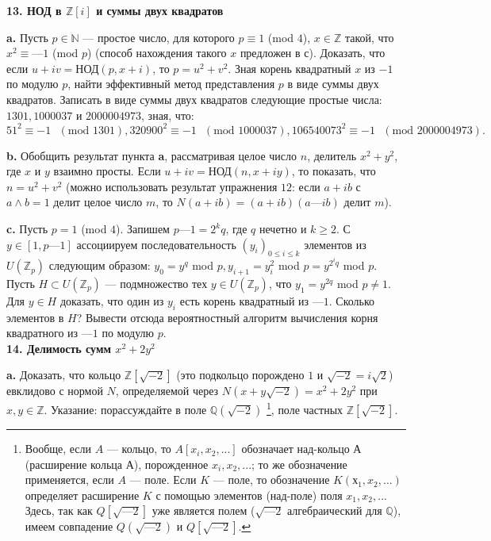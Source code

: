 \pagebreak

\noindent \textbf{13. НОД в $\mathbb{Z}[i]$ и суммы двух квадратов}

\textbf{a.} Пусть $p \in \mathbb{N}$ — простое число, для которого $p \equiv 1$ (mod $4$), $x \in \mathbb{Z}$ такой, что $x^2 \equiv —1$ (mod $p$) (способ нахождения такого $x$ предложен в с). Доказать, что если $u + iv = $НОД$(p, x + i)$, то $p = u^2 + v^2$. Зная корень квадратный $x$ из $-1$ по модулю $p$, найти эффективный метод представления $p$ в виде суммы двух квадратов. Записать в виде суммы двух квадратов следующие простые числа: $1301, 1000037$ и $2 000 004 973$, зная, что:
\[
51^2 \equiv -1 \text{ } (\text{mod } 1301), 320900^2 \equiv -1 \text{ } (\text{mod } 1000037), 106540073^2 \equiv -1 \text{ } (\text{mod } 2000004973).
\]

\textbf{b.} Обобщить результат пункта \textbf{a}, рассматривая целое число $n$, делитель $x^2 + y^2$, где $x$ и $y$ взаимно просты. Если $u+iv = $НОД$(n, x + iy)$, то показать, что $n=u^2+v^2$ (можно использовать результат 
упражнения $12$: если $a + ib$ с $a \wedge b = 1$ делит целое число $m$, то $N(a + ib) = (a + ib)(a — ib)$ делит $m$).

\textbf{c.} Пусть $p = 1$ (mod $4$). Запишем $p—1 = 2^kq$, где $q$ нечетно и $k \ge 2$. С $y \in [1,p—1]$ ассоциируем последовательность $(y_i)_{0\le i\le k}$ элементов из $U(\mathbb{Z}_p)$ следующим образом: $y_0 = y^q$ mod $p, y_{i+1} = y^2_i$ mod $p = y^{2^iq}$ mod $p$. Пусть $H \subset U(\mathbb{Z}_p)$ — подмножество тех $y \in U(\mathbb{Z}_p)$, что $y_1 = y^{2q}$ mod $p \ne
1$. Для $y \in H$ доказать, что один из $y_i$ есть корень квадратный из $—1$.
Сколько элементов в $H$? Вывести отсюда вероятностный алгоритм 
вычисления корня квадратного из $—1$ по модулю $p$.
\\

\noindent \textbf{14. Делимость сумм $x^2+2 y^2$}

\textbf{a.} Доказать, что кольцо $\mathbb{Z}[\sqrt{-2}]$ (это подкольцо порождено $1$ и $\sqrt{-2}=i\sqrt{2}$) евклидово с нормой $N$, определяемой через $N(x+y\sqrt{-2}) = x^2+2y^2$ при $x,y \in \mathbb{Z}$. Указание: порассуждайте в поле $\mathbb{Q}(\sqrt{-2})$ \footnote{Вообще, если $A$ — кольцо, то $A[x_i,x_2,...]$ обозначает над-кольцо $А$ (расширение
кольца $А$), порожденное $x_i,x_2,...$; то же обозначение применяется, если $A$ — поле. Если $K$ — поле, то обозначение $K(х_1,x_2,...)$ определяет расширение $K$ с помощью элементов (над-поле) поля $x_1,x_2,...$ Здесь, так как $Q[\sqrt{—2}]$ уже является полем ($\sqrt{—2}$ алгебраический для $\mathbb{Q}$), имеем совпадение $Q(\sqrt{—2})$ и $Q[\sqrt{— 2}]$.}, поле частных $\mathbb{Z}[\sqrt{-2}]$.

